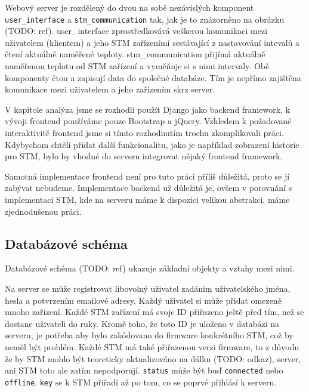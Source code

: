 

Webový server je rozdělený do dvou na sobě nezávislých komponent \texttt{user\_interface} a
\texttt{stm\_communication} tak, jak je to znázorněno na obrázku (TODO: ref).
user_interface zprostředkovává veškerou komunikaci mezi uživatelem (klientem) a jeho STM
zařízeními sestávající z nastavování intevalů a čtení aktuálně naměřené teploty.
stm_communication přijímá aktuálně naměřenou teplotu od STM zařízení a vyměňuje si s nimi intervaly.
Obě komponenty čtou a zapisují data do společné databáze.
Tím je nepřímo zajištěna komunikace mezi uživatelem a jeho zařízením skrz server.

V kapitole analýza jsme se rozhodli použít Django jako backend framework, k vývoji frontend
používáme pouze Bootstrap a jQuery.
Vzhledem k požadované interaktivitě frontend jsme si tímto rozhodnutím trochu zkomplikovali práci.
Kdybychom chtěli přidat další funkcionalitu, jako je například zobrazení historie pro STM,
bylo by vhodné do serveru integrovat nějaký frontend framework.

Samotná implementace frontend není pro tuto práci příliš důležitá, proto se jí zabývat nebudeme.
Implementace backend už důležitá je, ovšem v porovnání s implementací STM, kde na serveru máme
k dispozici velikou abstrakci, máme zjednodušenou práci.

\subsection{Databázové schéma}


Databázové schéma (TODO: ref) ukazuje základní objekty a vztahy mezi nimi.

Na server se může registrovat libovolný uživatel zadáním uživatelského jména, hesla a potvrzením
emailové adresy.
Každý uživatel si může přidat omezeně mnoho zařízení.
Každé STM zařízení má svoje ID přiřazeno ještě před tím, než se dostane uživateli do ruky.
Kromě toho, že toto ID je uloženo v databázi na serveru, je potřeba aby bylo zakódovano do firmware
konkrétního STM, což by neměl být problém.
Každé STM má také přiřazenou verzi firmware, to z důvodu že by STM mohlo být teoreticky aktualizováno
na dálku (TODO: odkaz), server, ani STM toto ale zatím nepodporují.
\texttt{status} může být buď \texttt{connected} nebo \texttt{offline}.
\texttt{key} se k STM přiřadí až po tom, co se poprvé přihlásí k serveru.

